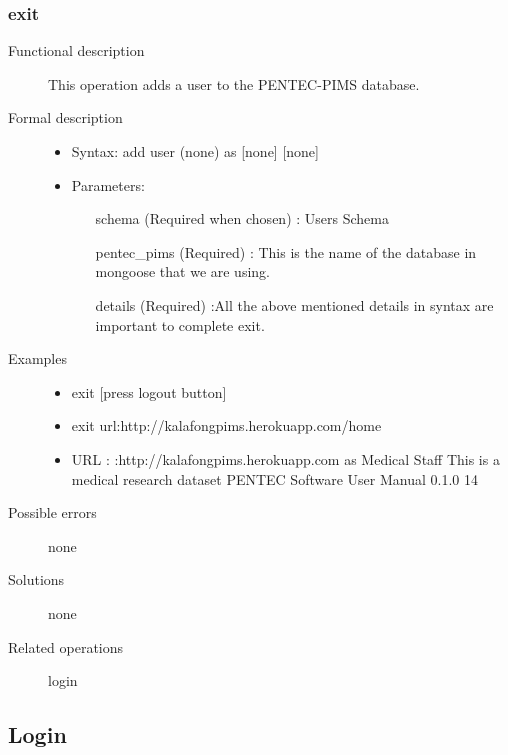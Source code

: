 \documentclass[14pt, a4paper]{article}
\begin{document}
\subsubsection{exit}
\begin{description}
\item[Functional description] This operation adds a user to the PENTEC-PIMS database.
\item[Formal description]\hfill
\begin{itemize}
	\item Syntax: add user (none) as [none] [none]\\
	\item Parameters:
	\begin{itemize}
		\item [schema] (Required when chosen) : Users Schema
		\item [pentec\_pims] (Required) : This is the name of the database in mongoose that we are using.
		\item [details] (Required) :All the above mentioned details in syntax are important to complete exit.
	\end{itemize}
\end{itemize}

\item[Examples]\hfill
\begin{itemize}
	\item exit [press logout button]
	\item exit url:http://kalafongpims.herokuapp.com/home
	\item URL : :http://kalafongpims.herokuapp.com as Medical Staff This is a medical research dataset
	PENTEC Software User Manual 0.1.0 14
\end{itemize}

\item[Possible errors] none
\item[Solutions] none
\item [Related operations] login
\end{description}

\subsection{Login}
\end{document}

